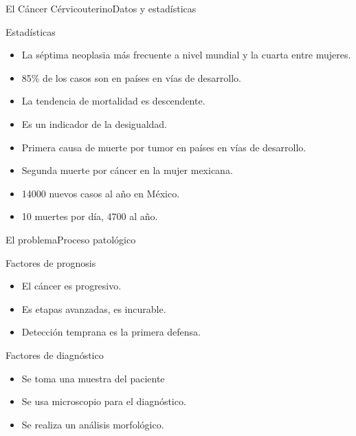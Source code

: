 \documentclass[aspectratio=169,10pt]{beamer}
\begin{document}
\begin{frame}{El Cáncer Cérvicouterino}{Datos y estadísticas}
  \begin{block}{Estadísticas}{
      \begin{itemize}
        \item La séptima neoplasia más frecuente a nivel mundial y la cuarta entre mujeres.
        \item 85\% de los casos son en países en vías de desarrollo.
        \item La tendencia de mortalidad es descendente.
        \item Es un indicador de la desigualdad.
        \item Primera causa de muerte por tumor en países en vías de desarrollo.
        \item Segunda muerte por cáncer en la mujer mexicana.
        \item 14000 nuevos casos al año en México.
        \item 10 muertes por día, 4700 al año.
      \end{itemize}
    }
  \end{block}
\end{frame}

\begin{frame}{El problema}{Proceso patológico}

  \begin{block}{Factores de prognosis}
    {
      \begin{itemize}
        \item El cáncer es progresivo.
        \item Es etapas avanzadas, es incurable.
        \item Detección temprana es la primera defensa.
      \end{itemize}
    }
  \end{block}

  \begin{exampleblock}{Factores de diagnóstico}
    {
      \begin{itemize}
        \item Se toma una muestra del paciente
        \item Se usa microscopio para el diagnóstico.
        \item Se realiza un análisis morfológico.
      \end{itemize}
    }
  \end{exampleblock}
\end{frame}
\end{document}
